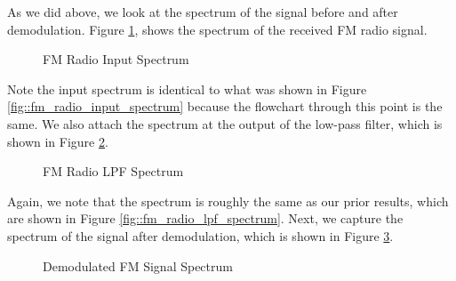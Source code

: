 \documentclass{article}
\begin{document}
As we did above, we look at the spectrum of the signal before and after demodulation. Figure \ref{fig::fm_radio_user_input_spectrum}, shows the spectrum of the received FM radio signal.
 
\begin{figure}[H]
	\centerline{}
	\caption{FM Radio Input Spectrum}
	\label{fig::fm_radio_user_input_spectrum}
\end{figure}

\noindent Note the input spectrum is identical to what was shown in Figure \ref{fig::fm_radio_input_spectrum} because the flowchart through this point is the same.  We also attach the spectrum at the output of the low-pass filter, which is shown in Figure \ref{fig::fm_radio_user_lpf_spectrum}.

\begin{figure}[H]
	\centerline{}
	\caption{FM Radio LPF Spectrum}
	\label{fig::fm_radio_user_lpf_spectrum}
\end{figure}

\noindent Again, we note that the spectrum is roughly the same as our prior results, which are shown in Figure \ref{fig::fm_radio_lpf_spectrum}. Next, we capture the spectrum of the signal after demodulation, which is shown in Figure \ref{fig::fm_radio_user_demod_spectrum}.

\begin{figure}[H]
	\centerline{}
	\caption{Demodulated FM Signal Spectrum}
	\label{fig::fm_radio_user_demod_spectrum}
\end{figure}
\end{document}
